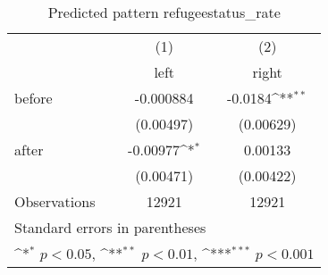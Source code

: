 \begin{table}[htbp]\centering
\def\sym#1{\ifmmode^{#1}\else\(^{#1}\)\fi}
\caption{Predicted pattern refugeestatus\_rate}
\begin{tabular}{l*{2}{c}}
\hline\hline
                    &\multicolumn{1}{c}{(1)}&\multicolumn{1}{c}{(2)}\\
                    &\multicolumn{1}{c}{left}&\multicolumn{1}{c}{right}\\
\hline
before              &   -0.000884         &     -0.0184\sym{**} \\
                    &   (0.00497)         &   (0.00629)         \\
[1em]
after               &    -0.00977\sym{*}  &     0.00133         \\
                    &   (0.00471)         &   (0.00422)         \\
\hline
Observations        &       12921         &       12921         \\
\hline\hline
\multicolumn{3}{l}{\footnotesize Standard errors in parentheses}\\
\multicolumn{3}{l}{\footnotesize \sym{*} \(p<0.05\), \sym{**} \(p<0.01\), \sym{***} \(p<0.001\)}\\
\end{tabular}
\end{table}
